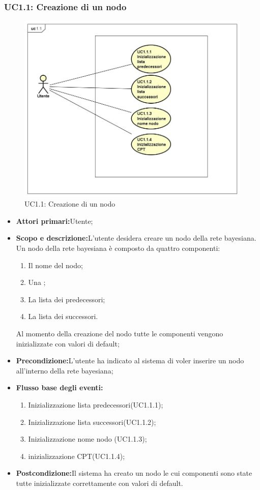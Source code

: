 \subsubsection{UC1.1: Creazione di un nodo}
\begin{figure} [H]
	\centering
	\includegraphics[scale=0.45]{Img/UC1-1}
	\caption{UC1.1: Creazione di un nodo}\label{}
\end{figure}
\begin{itemize}
	\item{\textbf{Attori primari:}Utente;}
	\item{\textbf{Scopo e descrizione:}L'utente desidera creare un nodo della rete bayesiana. Un nodo della rete bayesiana è composto da quattro componenti:
	\begin{enumerate}
		\item{Il nome del nodo;}
		\item{Una ;}
		\item{La lista dei predecessori;}
		\item{La lista dei successori.}
	\end{enumerate}
Al momento della creazione del nodo tutte le componenti vengono inizializzate con valori di default;}
	\item{\textbf{Precondizione:}L'utente ha indicato al sistema di voler inserire un nodo all'interno della rete bayesiana;}
	\item{\textbf{Flusso base degli eventi:}}
		\begin{enumerate}
			\item{Inizializzazione lista predecessori(UC1.1.1);}
			\item{Inizializzazione lista successori(UC1.1.2);}
			\item{Inizializzazione nome nodo (UC1.1.3);}
			\item{inizializzazione CPT(UC1.1.4);}
		\end{enumerate}
	\item{\textbf{Postcondizione:}Il sistema ha creato un nodo le cui componenti sono state tutte inizializzate correttamente con valori di default.}
\end{itemize}
